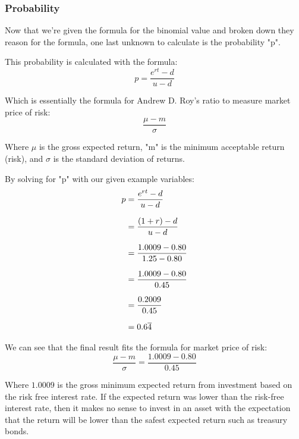 \documentclass[12pt, letterpaper]{article}\usepackage{float}
\begin{document}
\subsubsection*{Probability}
Now that we're given the formula for the binomial value and broken down they reason for the formula, one last unknown to calculate is the probability "p".

This probability is calculated with the formula:
\begin{equation*}
  p = \frac{e^{rt} - d}{u - d}
\end{equation*}

Which is essentially the formula for Andrew D. Roy's ratio to measure market price of risk:
\begin{equation*}
  \frac{\mu - m}{\sigma}
\end{equation*}

Where $\mu$ is the gross expected return, "m" is the minimum acceptable return (risk), and $\sigma$ is the standard deviation of returns.

By solving for "p" with our given example variables:
\begin{equation*}
  \setlength{\jot}{10pt}
  \begin{split}
    p
    & = \frac{e^{rt} - d}{u - d}
    \\
    & = \frac{(1+r) - d}{u - d}
    \\
    & = \frac{1.0009 - 0.80}{1.25 - 0.80}
    \\
    & = \frac{1.0009 - 0.80}{0.45}
    \\
    & = \frac{0.2009}{0.45}
    \\
    & = 0.6\overline{4}
  \end{split}
\end{equation*}

We can see that the final result fits the formula for market price of risk:
\begin{equation*}
  \frac{\mu - m}{\sigma} = \frac{1.0009 - 0.80}{0.45}
\end{equation*}

Where ${1.0009}$ is the gross minimum expected return from investment based on the risk free interest rate.
If the expected return was lower than the risk-free interest rate, then it makes no sense to invest in an asset with the expectation that the return will be lower than the safest expected return such as treasury bonds.
\end{document}
